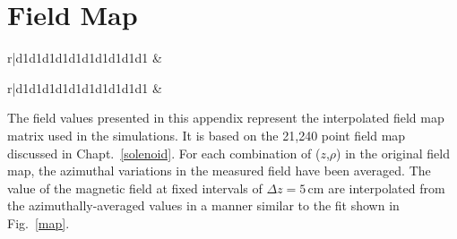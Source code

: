 \cleardoublepage
\chapter{Field Map}
\label{field_map_data}
\renewcommand{\arraystretch}{0.8} %
\renewcommand{\tabcolsep}{1.9mm} %
\begin{table}[ht]
\centering
\begin{tabular}{r|d{1}d{1}d{1}d{1}d{1}d{1}d{1}d{1}d{1}d{1}}
\hline
{} &\\ %


\hline
\end{tabular}
\caption{Average axial field strength $\mathscr{B}_z$ of the HELIOS solenoid in gauss. }
\label{axial_field}
\end{table}

\begin{table}[t]
\centering
\begin{tabular}{r|d{1}d{1}d{1}d{1}d{1}d{1}d{1}d{1}d{1}d{1}}
\hline
{} &\\ %

\hline
\end{tabular}
\caption{Average radial field strength $\mathscr{B}_\rho$ of the HELIOS solenoid in gauss.}
\label{radial_field}
\end{table}

The field values presented in this appendix represent the interpolated field map matrix used in the simulations.  It is based on the 21,240 point field map discussed in Chapt.~\ref{solenoid}.  For each combination of ($z$,$\rho$) in the original field map, the azimuthal variations in the measured field have been averaged.  The value of the magnetic field at fixed intervals of $\Delta z=5$\,cm are interpolated from the azimuthally-averaged values in a manner similar to the fit shown in Fig.~\ref{map}.

